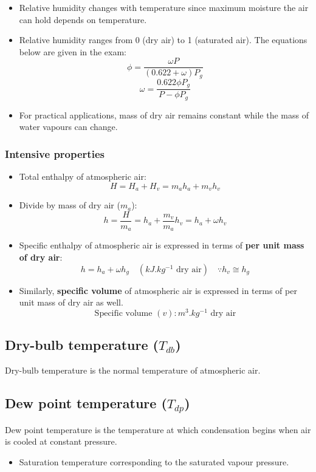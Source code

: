 \documentclass[11pt]{article}
\begin{document}
\begin{itemize}
\item Relative humidity changes with temperature since maximum moisture the air can hold depends on temperature.
\item Relative humidity ranges from 0 (dry air) to 1 (saturated air). The equations below are given in the exam:
\[\phi = \frac{\omega P}{(0.622 + \omega) P_g}\]
\[\omega = \frac{0.622 \phi P_g}{P - \phi P_g}\]
\item For practical applications, mass of dry air remains constant while the mass of water vapours can change.
\end{itemize}

\subsubsection{Intensive properties}
\label{sec:org6f39f39}
\begin{itemize}
\item Total enthalpy of atmospheric air:
\[H = H_a + H_v = m_a h_a + m_v h_v\]
\item Divide by mass of dry air (\(m_a\)):
\[h = \frac{H}{m_a} = h_a + \frac{m_v}{m_a} h_v = h_a + \omega h_v\]
\item Specific enthalpy of atmospheric air is expressed in terms of \textbf{per unit mass of dry air}:
\[h = h_a + \omega h_g \quad (\unit{kJ.kg^{-1}} \text{ dry air}) \quad \because h_v \cong h_g\]
\item Similarly, \textbf{specific volume} of atmospheric air is expressed in terms of per unit mass of dry air as well.
\[\text{Specific volume } (v): \unit{m^3.kg^{-1}} \text{ dry air}\]
\end{itemize}

\subsection{Dry-bulb temperature (\(T_{db}\))}
\label{sec:org93b1361}
Dry-bulb temperature is the normal temperature of atmospheric air.

\subsection{Dew point temperature (\(T_{dp}\))}
\label{sec:org90544d9}
Dew point temperature is the temperature at which condensation begins when air is cooled at constant pressure.
\begin{itemize}
\item Saturation temperature corresponding to the saturated vapour pressure.
\end{itemize}
\end{document}
